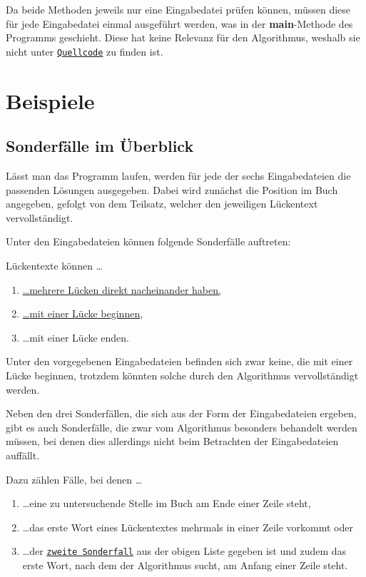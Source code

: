 \documentclass[a4paper, 10pt, ngerman]{scrartcl}
\begin{document}
Da beide Methoden jeweils nur eine Eingabedatei prüfen können,
müssen diese für jede Eingabedatei einmal ausgeführt werden,
was in der \textbf{main}-Methode des Programms geschieht.
Diese hat keine Relevanz für den Algorithmus,
weshalb sie nicht unter \hyperref[sec:quellcode]{\texttt{Quellcode}} zu finden ist.


\section{Beispiele}\label{sec:beispiele}
\subsection{Sonderfälle im Überblick}\label{ueberblickSondefaelle}
Lässt man das Programm laufen,
werden für jede der sechs Eingabedateien die passenden Lösungen ausgegeben.
Dabei wird zunächst die Position im Buch angegeben,
gefolgt von dem Teilsatz,
welcher den jeweiligen Lückentext vervollständigt.

Unter den Eingabedateien können folgende Sonderfälle auftreten:

Lückentexte können \ldots

\begin{enumerate}
	\item \hyperref[sec:ersterSonderfall]{\ldots mehrere Lücken direkt nacheinander haben,}\label{sonderfallEins}
	\item \hyperref[sec:zweiterSonderfall]{\ldots mit einer Lücke beginnen},\label{sonderfallZwei}
	\item \ldots mit einer Lücke enden.\label{sonderfallDrei}
    \setcounter{enumTemp}{\theenumi}
\end{enumerate}

Unter den vorgegebenen Eingabedateien befinden sich zwar keine,
die mit einer Lücke beginnen,
trotzdem könnten solche durch den Algorithmus vervollständigt werden.

Neben den drei Sonderfällen,
die sich aus der Form der Eingabedateien ergeben,
gibt es auch Sonderfälle,
die zwar vom Algorithmus besonders behandelt werden müssen,
bei denen dies allerdings nicht beim Betrachten der Eingabedateien auffällt.

Dazu zählen Fälle,
bei denen \ldots

\begin{enumerate}
	\setcounter{enumi}{\theenumTemp}
	\item \ldots eine zu untersuchende Stelle im Buch am Ende einer Zeile steht,\label{sonderfallVier}
	\item \ldots das erste Wort eines Lückentextes mehrmals in einer Zeile vorkommt oder\label{sonderfallFuenf}
	\item \ldots der \hyperref[sonderfallZwei]{\texttt{zweite Sonderfall}} aus der obigen Liste gegeben ist
	und zudem das erste Wort,
	nach dem der Algorithmus sucht,
	am Anfang einer Zeile steht.\label{sonderfallSechs}
\end{enumerate}
\end{document}
